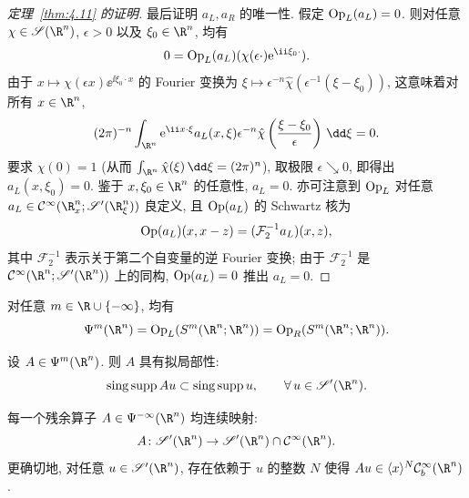 \begin{proof}[定理~\ref{thm:4.11} 的证明]
最后证明 $a_L, a_R$ 的唯一性. 假定 $\operatorname{Op}_L(a_L) = 0$. 则对任意 $\chi \in \Schwartz(\R^n)$, $\epsilon > 0$ 以及 $\xi_0 \in \R^n$, 均有
\begin{equation}\label{eq:4.70}
    0 = \Op_L(a_L)(\chi(\epsilon \cdot) \ee^{\ii \xi_0 \cdot}).
\end{equation}
由于 $x \mapsto \chi(\epsilon x) \ee^{\ii \xi_0 \cdot x}$ 的 Fourier 变换为 $\xi \mapsto \epsilon^{-n} \hat{\chi}(\epsilon^{-1}(\xi - \xi_0))$, 这意味着对所有 $x \in \R^n$,
\begin{equation}\label{eq:4.71}
    (2\pi)^{-n} \int_{\R^n} \ee^{\ii x \cdot \xi} a_L(x, \xi) \epsilon^{-n} \hat{\chi}\left( \frac{\xi - \xi_0}{\epsilon} \right) \,\dd\xi = 0.
\end{equation}
要求 $\chi(0) = 1$ (从而 $\int_{\R^n} \hat{\chi}(\xi) \,\dd\xi = (2\pi)^n$), 取极限 $\epsilon \searrow 0$, 即得出 $a_L(x, \xi_0) = 0$. 鉴于 $x, \xi_0 \in \R^n$ 的任意性, $a_L = 0$. 亦可注意到 $\operatorname{Op}_L$ 对任意 $a_L \in \mathcal{C}^\infty(\R_x^n; \TempDistr(\R_\xi^n))$ 良定义, 且 $\operatorname{Op}(a_L)$ 的 Schwartz 核为
\begin{equation}\label{eq:4.72}
    \operatorname{Op}(a_L)(x, x - z) = (\mathcal{F}_2^{-1} a_L)(x, z),
\end{equation}
其中 $\mathcal{F}_2^{-1}$ 表示关于第二个自变量的逆 Fourier 变换; 由于 $\mathcal{F}_2^{-1}$ 是 $\mathcal{C}^\infty(\R^n; \TempDistr(\R^n))$ 上的同构, $\operatorname{Op}(a_L) = 0$ 推出 $a_L = 0$.
\end{proof}

\begin{corollary}[伪微分算子空间的等价刻画]\label{cor:4.15}
对任意 $m \in \R \cup \{-\infty\}$, 均有
\[
    \Psi^m(\R^n) = \Op_L(S^m(\R^n; \R^n)) = \Op_R(S^m(\R^n; \R^n)).
\]
\end{corollary}

\begin{proposition}[伪微分算子的拟局部性]\label{prop:4.16}
设 $A \in \Psi^m(\R^n)$. 则 $A$ 具有拟局部性:
\begin{equation}\label{eq:4.73}
    \singsupp A u \subset \singsupp u, \qquad \forall\,u \in \TempDistr(\R^n).
\end{equation}
\end{proposition}

\begin{lemma}[残余算子在缓增分布上的作用]\label{lem:4.17}
每一个残余算子 $A \in \Psi^{-\infty}(\R^n)$ 均连续映射:
\begin{equation}\label{eq:4.74}
    A \colon \TempDistr(\R^n) \to \TempDistr(\R^n) \cap \Smooth(\R^n).
\end{equation}
更确切地, 对任意 $u \in \TempDistr(\R^n)$, 存在依赖于 $u$ 的整数 $N$ 使得 $A u \in \langle x \rangle^N \mathcal{C}_b^\infty(\R^n)$.
\end{lemma}

